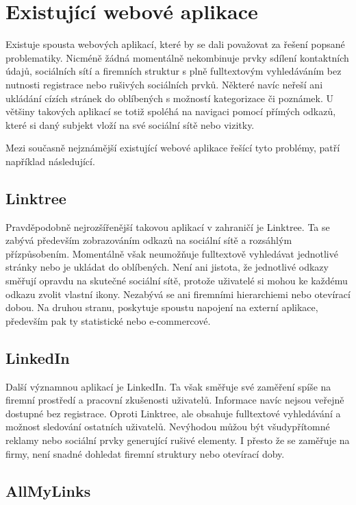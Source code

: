 \section{Existující webové aplikace}

Existuje spousta webových aplikací, které by se dali považovat za řešení popsané problematiky.
Nicméně žádná momentálně nekombinuje prvky sdílení kontaktních údajů, sociálních sítí a firemních struktur s plně
fulltextovým vyhledáváním bez nutnosti registrace nebo rušivých sociálních prvků.
Některé navíc neřeší ani ukládání cízích stránek do oblíbených s možností kategorizace či poznámek.
U většiny takových aplikací se totiž spoléhá na navigaci pomocí přímých odkazů, které si daný subjekt
vloží na své sociální sítě nebo vizitky.

Mezi současně nejznámější existující webové aplikace řešící tyto problémy, patří například následující.

	\subsection{Linktree}

	Pravděpodobně nejrozšířenější takovou aplikací v zahraničí je Linktree.
	Ta se zabývá především zobrazováním odkazů na sociální sítě a rozsáhlým přízpůsobením.
	Momentálně však neumožňuje fulltextově vyhledávat jednotlivé stránky nebo je ukládat do oblíbených.
	Není ani jistota, že jednotlivé odkazy směřují opravdu na skutečné sociální sítě, protože uživatelé si mohou ke každému
	odkazu zvolit vlastní ikony.
	Nezabývá se ani firemními hierarchiemi nebo otevírací dobou.
	Na druhou stranu, poskytuje spoustu napojení na externí aplikace, především pak ty statistické nebo e-commercové.

	\subsection{LinkedIn}

	Další významnou aplikací je LinkedIn.
	Ta však směřuje své zaměření spíše na firemní prostředí a pracovní zkušenosti uživatelů.
	Informace navíc nejsou veřejně dostupné bez registrace.
	Oproti Linktree, ale obsahuje fulltextové vyhledávání a možnost sledování ostatních uživatelů.
	Nevýhodou můžou být všudypřítomné reklamy nebo sociální prvky generující rušivé elementy.
	I přesto že se zaměřuje na firmy, není snadné dohledat firemní struktury nebo otevírací doby.

	\subsection{AllMyLinks}


